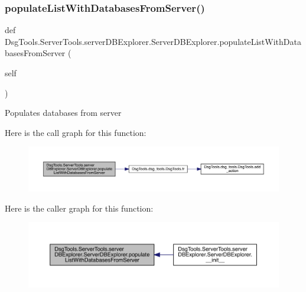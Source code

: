 \subsubsection{\texorpdfstring{populate\+List\+With\+Databases\+From\+Server()}{populateListWithDatabasesFromServer()}}
{\footnotesize\ttfamily def Dsg\+Tools.\+Server\+Tools.\+server\+D\+B\+Explorer.\+Server\+D\+B\+Explorer.\+populate\+List\+With\+Databases\+From\+Server (\begin{DoxyParamCaption}\item[{}]{self }\end{DoxyParamCaption})}

\begin{DoxyVerb}Populates databases from server
\end{DoxyVerb}
 Here is the call graph for this function\+:
\nopagebreak
\begin{figure}[H]
\begin{center}
\leavevmode
\includegraphics[width=350pt]{class_dsg_tools_1_1_server_tools_1_1server_d_b_explorer_1_1_server_d_b_explorer_af3736bfe6b6f860696b5efc396fd6842_cgraph}
\end{center}
\end{figure}
Here is the caller graph for this function\+:
\nopagebreak
\begin{figure}[H]
\begin{center}
\leavevmode
\includegraphics[width=350pt]{class_dsg_tools_1_1_server_tools_1_1server_d_b_explorer_1_1_server_d_b_explorer_af3736bfe6b6f860696b5efc396fd6842_icgraph}
\end{center}
\end{figure}
\mbox{\label{class_dsg_tools_1_1_server_tools_1_1server_d_b_explorer_1_1_server_d_b_explorer_a36574ae8ee6a72558eee39546b7f1342}} 
